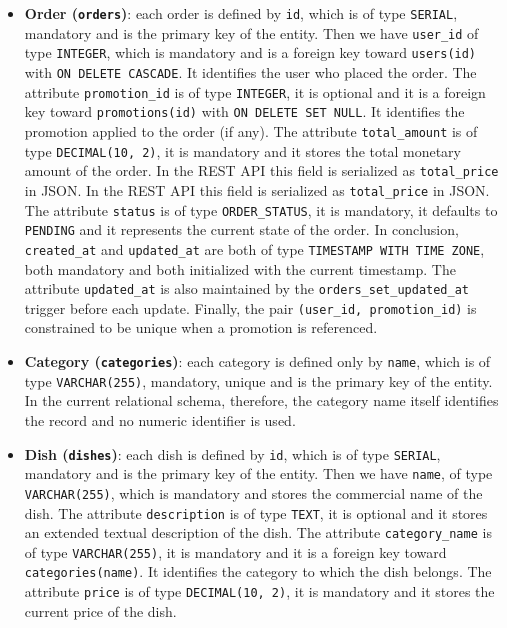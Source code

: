 \begin{itemize}
    \item \textbf{Order (\texttt{orders})}: each order is defined by \texttt{id}, which is of type \texttt{SERIAL}, mandatory and is the primary key of the entity. Then we have \texttt{user\_id} of type \texttt{INTEGER}, which is mandatory and is a foreign key toward \texttt{users(id)} with \texttt{ON DELETE CASCADE}. It identifies the user who placed the order. The attribute \texttt{promotion\_id} is of type \texttt{INTEGER}, it is optional and it is a foreign key toward \texttt{promotions(id)} with \texttt{ON DELETE SET NULL}. It identifies the promotion applied to the order (if any). The attribute \texttt{total\_amount} is of type \texttt{DECIMAL(10, 2)}, it is mandatory and it stores the total monetary amount of the order. In the REST API this field is serialized as \texttt{total\_price} in JSON. In the REST API this field is serialized as \texttt{total\_price} in JSON. The attribute \texttt{status} is of type \texttt{ORDER\_STATUS}, it is mandatory, it defaults to \texttt{PENDING} and it represents the current state of the order. In conclusion, \texttt{created\_at} and \texttt{updated\_at} are both of type \texttt{TIMESTAMP WITH TIME ZONE}, both mandatory and both initialized with the current timestamp. The attribute \texttt{updated\_at} is also maintained by the \texttt{orders\_set\_updated\_at} trigger before each update. Finally, the pair \texttt{(user\_id, promotion\_id)} is constrained to be unique when a promotion is referenced.

    \item \textbf{Category (\texttt{categories})}: each category is defined only by \texttt{name}, which is of type \texttt{VARCHAR(255)}, mandatory, unique and is the primary key of the entity. In the current relational schema, therefore, the category name itself identifies the record and no numeric identifier is used.

    \item \textbf{Dish (\texttt{dishes})}: each dish is defined by \texttt{id}, which is of type \texttt{SERIAL}, mandatory and is the primary key of the entity. Then we have \texttt{name}, of type \texttt{VARCHAR(255)}, which is mandatory and stores the commercial name of the dish. The attribute \texttt{description} is of type \texttt{TEXT}, it is optional and it stores an extended textual description of the dish. The attribute \texttt{category\_name} is of type \texttt{VARCHAR(255)}, it is mandatory and it is a foreign key toward \texttt{categories(name)}. It identifies the category to which the dish belongs. The attribute \texttt{price} is of type \texttt{DECIMAL(10, 2)}, it is mandatory and it stores the current price of the dish.


\end{itemize}

